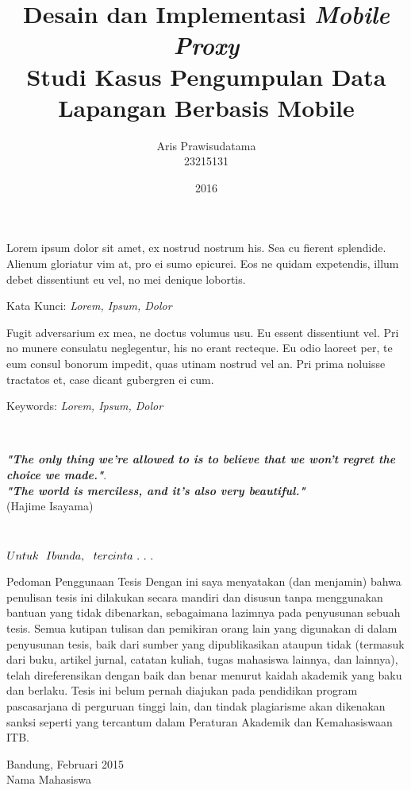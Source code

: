 \documentclass[12pt,a4paper,oneside]{book}
\title{Desain dan Implementasi \textit{Mobile Proxy} \\Studi Kasus Pengumpulan Data Lapangan Berbasis Mobile}
\author{Aris Prawisudatama\\23215131}
\date{2016}
\numberwithin{equation}{chapter}
\begin{document}
\frontmatter
{}
\makecustompengesahan

\begin{abstrak}[indo]
Lorem ipsum dolor sit amet, ex nostrud nostrum his. Sea cu fierent splendide. Alienum gloriatur vim at, pro ei sumo epicurei. Eos ne quidam expetendis, illum debet dissentiunt eu vel, no mei denique lobortis.

Kata Kunci: \textit{Lorem, Ipsum, Dolor}

\end{abstrak}
\begin{abstrak}[english]
Fugit adversarium ex mea, ne doctus volumus usu. Eu essent dissentiunt vel. Pri no munere consulatu neglegentur, his no erant recteque. Eu odio laoreet per, te eum consul bonorum impedit, quas utinam nostrud vel an. Pri prima noluisse tractatos et, case dicant gubergren ei cum.
  
Keywords: \textit{Lorem, Ipsum, Dolor}
\end{abstrak}

\
\vspace{5cm}

\begin{center}
\textbf{\textit{"The only thing we're allowed to is to believe that we won't regret the choice we made."}}. \\
\textbf{\textit{"The world is merciless, and it's also very beautiful."}} \\
(Hajime Isayama)
\end{center}

\
\vspace{9cm}

\begin{flushright}
\textbf{\large{$\mathnormal{Untuk \  \ Ibunda, \ \ tercinta \ . \ . \ .}$}}
\end{flushright}


    
\begin{custompage}{Pedoman Penggunaan Tesis}
Dengan ini saya menyatakan (dan menjamin) bahwa penulisan tesis ini dilakukan secara mandiri dan disusun tanpa menggunakan bantuan yang tidak dibenarkan, sebagaimana lazimnya pada penyusunan sebuah tesis. Semua kutipan tulisan dan pemikiran orang lain yang digunakan di dalam penyusunan tesis, baik dari sumber yang dipublikasikan ataupun tidak (termasuk dari buku, artikel jurnal, catatan kuliah, tugas mahasiswa lainnya, dan lainnya), telah direferensikan dengan baik dan benar menurut kaidah akademik yang baku dan berlaku. Tesis ini belum pernah diajukan pada pendidikan program pascasarjana di perguruan tinggi lain, dan tindak plagiarisme akan dikenakan sanksi seperti yang tercantum dalam Peraturan Akademik dan Kemahasiswaan ITB.

\begin{flushright}
Bandung, Februari 2015\\[2cm]
Nama Mahasiswa
\end{flushright} 
\end{custompage}
\end{document}
